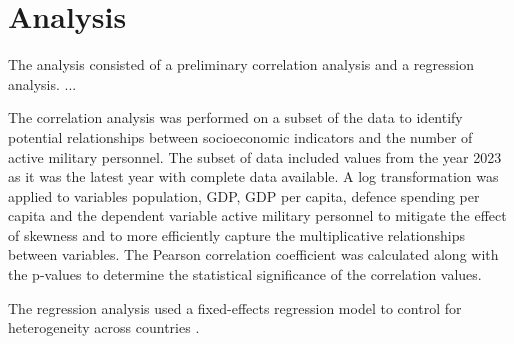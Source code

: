 \section{Analysis}

The analysis consisted of a preliminary correlation analysis and a regression analysis. ...

The correlation analysis was performed on a subset of the data to identify potential 
relationships between socioeconomic indicators and the number of active military 
personnel. The subset of data included values from the year 2023 as it was the latest
year with complete data available. A log transformation was applied to variables 
population, GDP, GDP per capita, defence spending per capita and the dependent variable 
active military personnel to mitigate the effect of skewness and to more efficiently 
capture the multiplicative relationships between variables.
The Pearson correlation coefficient was calculated along with the p-values to 
determine the statistical significance of the correlation values.

The regression analysis used a fixed-effects regression model to control for heterogeneity
across countries \parencite{backstrom_are_2019}. 
